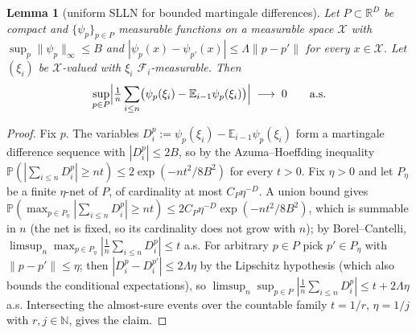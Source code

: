 \documentclass[pdflatex,sn-mathphys-num]{sn-jnl}
\theoremstyle{plain}
\newtheorem{lemma}[theorem]{Lemma}
\theoremstyle{definition}
\begin{document}
\begin{appendices}
\begin{lemma}[uniform SLLN for bounded martingale differences]\label{lem:uslln}
Let $P\subset\mathbb{R}^{D}$ be compact and $\{\psi_p\}_{p\in P}$ measurable functions on a measurable space $\mathcal{X}$ with $\sup_{p}\|\psi_p\|_\infty\le B$ and $|\psi_p(x)-\psi_{p'}(x)|\le\Lambda\|p-p'\|$ for every $x\in\mathcal{X}$. Let $(\xi_i)$ be $\mathcal{X}$-valued with $\xi_i$ $\mathcal{F}_i$-measurable. Then
\[
\sup_{p\in P}\Bigl|\tfrac1n\sum_{i\le n}\bigl(\psi_p(\xi_i)-\mathbb{E}_{i-1}\psi_p(\xi_i)\bigr)\Bigr|\;\longrightarrow\;0
\qquad\text{a.s.}
\]
\end{lemma}
\begin{proof}
Fix $p$. The variables $D^p_i:=\psi_p(\xi_i)-\mathbb{E}_{i-1}\psi_p(\xi_i)$ form a martingale difference sequence with $|D^p_i|\le2B$, so by the Azuma--Hoeffding inequality $\mathbb{P}(|\sum_{i\le n}D^p_i|\ge nt)\le2\exp(-nt^2/8B^2)$ for every $t>0$. Fix $\eta>0$ and let $P_\eta$ be a finite $\eta$-net of $P$, of cardinality at most $C_P\eta^{-D}$. A union bound gives $\mathbb{P}(\max_{p\in P_\eta}|\sum_{i\le n}D^p_i|\ge nt)\le2C_P\eta^{-D}\exp(-nt^2/8B^2)$, which is summable in $n$ (the net is fixed, so its cardinality does not grow with $n$); by Borel--Cantelli, $\limsup_n\max_{p\in P_\eta}|\tfrac1n\sum_{i\le n}D^p_i|\le t$ a.s. For arbitrary $p\in P$ pick $p'\in P_\eta$ with $\|p-p'\|\le\eta$; then $|D^p_i-D^{p'}_i|\le2\Lambda\eta$ by the Lipschitz hypothesis (which also bounds the conditional expectations), so $\limsup_n\sup_{p\in P}|\tfrac1n\sum_{i\le n}D^p_i|\le t+2\Lambda\eta$ a.s. Intersecting the almost-sure events over the countable family $t=1/r$, $\eta=1/j$ with $r,j\in\mathbb{N}$, gives the claim.
\end{proof}


\end{appendices}
\end{document}
